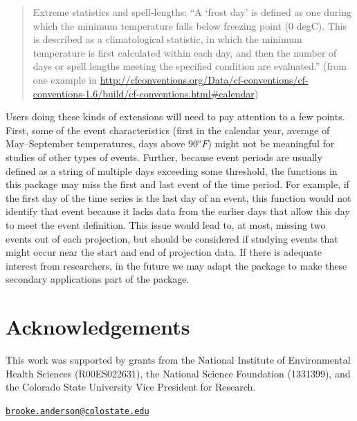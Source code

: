 \begin{quote}
Extreme statistics and spell-lengths: ``A `frost day' is defined as one
during which the minimum temperature falls below freezing point (0
degC). This is described as a climatological statistic, in which the
minimum temperature is first calculated within each day, and then the
number of days or spell lengths meeting the specified condition are
evaluated.'' (from one example in
\url{http://cfconventions.org/Data/cf-conventions/cf-conventions-1.6/build/cf-conventions.html\#calendar})
\end{quote}

Users doing these kinds of extensions will need to pay attention to a
few points. First, some of the event characteristics (first in the
calendar year, average of May--September temperatures, days above
\(90^{o}F\)) might not be meaningful for studies of other types of
events. Further, because event periods are usually defined as a string
of multiple days exceeding some threshold, the functions in this package
may miss the first and last event of the time period. For example, if
the first day of the time series is the last day of an event, this
function would not identify that event because it lacks data from the
earlier days that allow this day to meet the event definition. This
issue would lead to, at most, missing two events out of each projection,
but should be considered if studying events that might occur near the
start and end of projection data. If there is adequate interest from
researchers, in the future we may adapt the package to make these
secondary applications part of the package.

\section{Acknowledgements}\label{acknowledgements}

This work was supported by grants from the National Institute of
Environmental Health Sciences (R00ES022631), the National Science
Foundation (1331399), and the Colorado State University Vice President
for Research.



\address{%
G. Brooke Anderson\\
Colorado State University\\
Department of Environmental \& Radiological Health Sciences\\ 1681 Campus Delivery\\ Fort Collins, Colorado 80523\\
}
\href{mailto:brooke.anderson@colostate.edu}{\nolinkurl{brooke.anderson@colostate.edu}}

